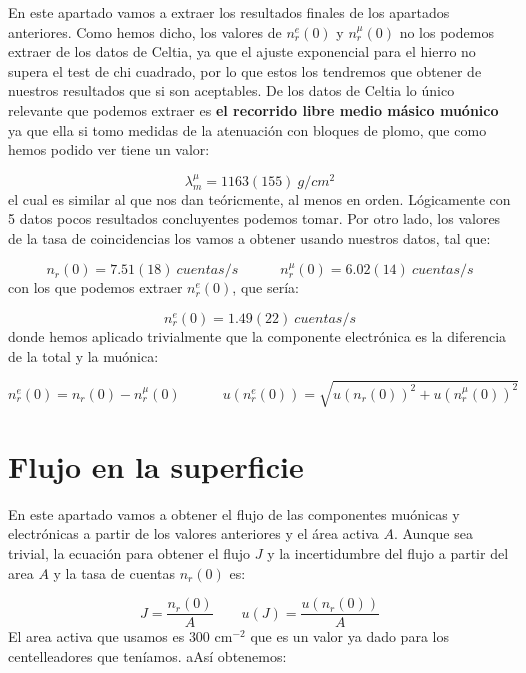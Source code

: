 \documentclass[11pt]{article}
\newcommand{\tquad}{\quad \quad \quad}
\begin{document}
En este apartado vamos a extraer los resultados finales de los apartados anteriores. Como hemos dicho, los valores de $n_r^e(0)$ y $n_r^\mu(0)$ no los podemos extraer de los datos de Celtia, ya que el ajuste exponencial para el hierro no supera el test de chi cuadrado, por lo que estos los tendremos que obtener de nuestros resultados que si son aceptables. De los datos de Celtia lo único relevante que podemos extraer es \textbf{el recorrido libre medio másico muónico} ya que ella si tomo medidas de la atenuación con bloques de plomo, que como hemos podido ver tiene un valor: 

\begin{equation}
	\lambda_m^\mu = 1163(155) \ \unit{g/cm^2}
\end{equation}
el cual es similar al que nos dan teóricmente, al menos en orden. Lógicamente con 5 datos pocos resultados concluyentes podemos tomar. Por otro lado, los valores de la tasa de coincidencias los vamos a obtener usando nuestros datos, tal que: 

\begin{equation}
	n_r(0) = 7.51(18)  \ \unit{cuentas/s}  \tquad 
	n_r^\mu (0) = 6.02(14) \ \unit{cuentas/s} 
\end{equation}
con los que podemos extraer $n_r^e(0)$, que sería: 

\begin{equation}
	n_r^e(0) = 1.49(22)  \ \unit{cuentas/s}   
\end{equation}
donde hemos aplicado trivialmente que la componente electrónica es la diferencia de la total y la muónica: 

\begin{equation}
	n_r^e (0) = n_r (0) - n_r^\mu (0) \tquad u(n_r^e(0))=\sqrt{u(n_r (0) )^2 + u(n_r^\mu (0) )^2}
\end{equation}
 
\section{Flujo en la superficie}

En este apartado vamos a obtener el flujo de las componentes muónicas y electrónicas a partir de los valores anteriores y el área activa $A$. Aunque sea trivial, la ecuación para obtener el flujo $J$ y la incertidumbre del flujo a partir del area $A$ y la tasa de cuentas $n_r(0)$ es: 

\begin{equation}
	J = \frac{n_r(0)}{A} \qquad u(J) = \frac{u(n_r(0))}{A}
\end{equation}
El area activa que usamos es $300$ cm$^{-2}$ que es un valor ya dado para los centelleadores que teníamos. aAsí obtenemos:
\end{document}
